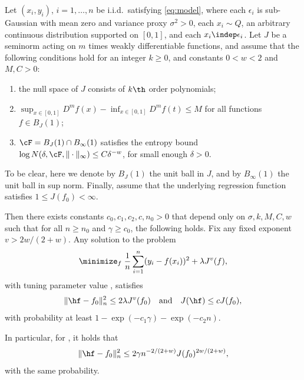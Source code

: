 \documentclass{article}
\begin{document}
\begin{theorem}
\label{thm:main}
Let $(x_i,y_i)$, $i=1,\dots,n$ be i.i.d.\ satisfying \eqref{eq:model}, where
each $\epsilon_i$ is sub-Gaussian with mean zero and variance proxy
$\sigma^2>0$, each $x_i \sim Q$, an arbitrary continuous distribution supported
on $[0,1]$, and each $x_i \indep \epsilon_i$. Let $J$ be a seminorm acting on
$m$ times weakly differentiable functions, and assume that the following
conditions hold for an integer $k \geq 0$, and constants $0<w<2$ and $M,C>0$: 
\begin{enumerate}[label=A\arabic*.]
\item the null space of $J$ consists of $k\th$ order polynomials;
\item $\sup_{x \in [0,1]} D^m f (x) - \inf_{x \in [0,1]} D^m f(t) \leq M$ for
  all functions $f \in B_J(1)$;
\item $\cF = B_J(1) \cap B_\infty(1)$ satisfies the entropy bound $\log
  N(\delta, \cF, \|\cdot\|_\infty) \leq C \delta^{-w}$, for small enough
  $\delta>0$. 
\end{enumerate}
To be clear, here we denote by $B_J(1)$ the unit ball in $J$, and by
$B_\infty(1)$ the unit ball in sup norm. Finally, assume that the underlying
regression function satisfies $1 \leq J(f_0) < \infty$.  

Then there exists constants $c_0,c_1,c_2,c,n_0>0$ that depend only on   
$\sigma,k,M,C,w$ such that for all $n \geq n_0$ and $\gamma \geq c_0$, the 
following holds. Fix any fixed exponent $v > 2w/(2+w)$. Any solution
\smash{$\hf$} to the problem  
\begin{equation}
\label{eq:variational_opt_v}
\minimize_f \; \frac{1}{n} \sum_{i=1}^n (y_i - f(x_i))^2 + \lambda J^v(f), 
\end{equation}
with tuning parameter value , satisfies     
\begin{equation}
\label{eq:error_bd1}
\|\hf - f_0\|_n^2 \leq 2 \lambda J^v(f_0) \quad \text{and} \quad J(\hf) \leq c
J(f_0), 
\end{equation}
with probability at least $1 - \exp(-c_1\gamma) - \exp(-c_2n)$. 

In particular, for , it holds that  
\begin{equation}
\label{eq:error_bd2}
\|\hf - f_0\|_n^2 \leq 2 \gamma n^{-2/(2+w)} J(f_0)^{2w/(2+w)},
\end{equation}
with the same probability.
\end{theorem}
\end{document}
